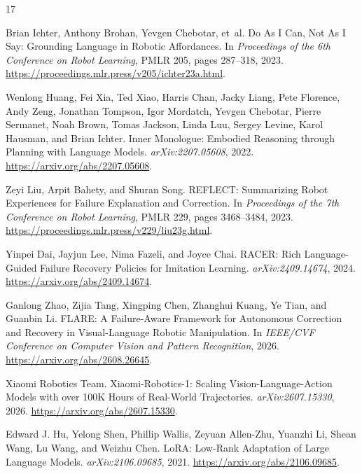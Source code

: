 \begin{thebibliography}{17}

Brian Ichter, Anthony Brohan, Yevgen Chebotar, et~al.
Do As I Can, Not As I Say: Grounding Language in Robotic Affordances.
In \emph{Proceedings of the 6th Conference on Robot Learning}, PMLR 205, pages 287--318, 2023.
\url{https://proceedings.mlr.press/v205/ichter23a.html}.

Wenlong Huang, Fei Xia, Ted Xiao, Harris Chan, Jacky Liang, Pete Florence, Andy Zeng, Jonathan Tompson, Igor Mordatch, Yevgen Chebotar, Pierre Sermanet, Noah Brown, Tomas Jackson, Linda Luu, Sergey Levine, Karol Hausman, and Brian Ichter.
Inner Monologue: Embodied Reasoning through Planning with Language Models.
\emph{arXiv:2207.05608}, 2022.
\url{https://arxiv.org/abs/2207.05608}.

Zeyi Liu, Arpit Bahety, and Shuran Song.
REFLECT: Summarizing Robot Experiences for Failure Explanation and Correction.
In \emph{Proceedings of the 7th Conference on Robot Learning}, PMLR 229, pages 3468--3484, 2023.
\url{https://proceedings.mlr.press/v229/liu23g.html}.

Yinpei Dai, Jayjun Lee, Nima Fazeli, and Joyce Chai.
RACER: Rich Language-Guided Failure Recovery Policies for Imitation Learning.
\emph{arXiv:2409.14674}, 2024.
\url{https://arxiv.org/abs/2409.14674}.

Ganlong Zhao, Zijia Tang, Xingping Chen, Zhanghui Kuang, Ye Tian, and Guanbin Li.
FLARE: A Failure-Aware Framework for Autonomous Correction and Recovery in Visual-Language Robotic Manipulation.
In \emph{IEEE/CVF Conference on Computer Vision and Pattern Recognition}, 2026.
\url{https://arxiv.org/abs/2608.26645}.

Xiaomi Robotics Team.
Xiaomi-Robotics-1: Scaling Vision-Language-Action Models with over 100K Hours of Real-World Trajectories.
\emph{arXiv:2607.15330}, 2026.
\url{https://arxiv.org/abs/2607.15330}.

Edward J. Hu, Yelong Shen, Phillip Wallis, Zeyuan Allen-Zhu, Yuanzhi Li, Shean Wang, Lu Wang, and Weizhu Chen.
LoRA: Low-Rank Adaptation of Large Language Models.
\emph{arXiv:2106.09685}, 2021.
\url{https://arxiv.org/abs/2106.09685}.


\end{thebibliography}
